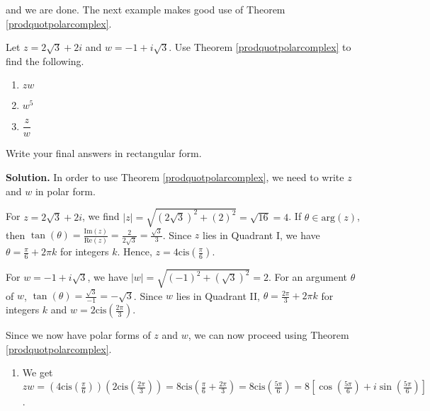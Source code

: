 \documentclass{ximera}
\begin{document}
and we are done.  The next example makes good use of Theorem \ref{prodquotpolarcomplex}.


\begin{ex}  \label{polararithmeticex} Let $z = 2\sqrt{3} + 2i$ and $w = -1 + i\sqrt{3}$.  Use Theorem \ref{prodquotpolarcomplex} to find the following.

\begin{multicols}{3}

\begin{enumerate}

\item $zw$

\item  $w^5$

\item $\dfrac{z}{w}$

\end{enumerate}

\end{multicols}

Write your final answers in rectangular form.

\medskip

{\bf Solution.}  In order to use Theorem \ref{prodquotpolarcomplex}, we need to write $z$ and $w$ in polar form.

\smallskip

  For $z=2\sqrt{3} + 2i$, we find $|z| = \sqrt{(2\sqrt{3})^2 + (2)^2} = \sqrt{16} = 4$.  If $\theta \in \text{arg}(z)$, then  $\tan(\theta) = \frac{\text{Im}(z)}{\text{Re}(z)} = \frac{2}{2\sqrt{3}} = \frac{\sqrt{3}}{3}$.  Since $z$ lies in Quadrant I, we have $\theta = \frac{\pi}{6} + 2\pi k$ for integers $k$.  Hence, $z = 4 \text{cis}\left(\frac{\pi}{6}\right)$. 
  
  \smallskip
  
  For $w = -1 + i\sqrt{3}$, we have $|w| = \sqrt{(-1)^2+(\sqrt{3})^2} = 2$.  For an argument $\theta$ of $w$,  $\tan(\theta) = \frac{\sqrt{3}}{-1} = -\sqrt{3}$.  Since $w$ lies in Quadrant II,  $\theta = \frac{2\pi}{3} + 2\pi k$ for integers $k$ and $w = 2\text{cis}\left(\frac{2\pi}{3}\right)$.  
  
  \smallskip
  
  Since we now have polar forms of $z$ and $w$, we can now proceed using Theorem \ref{prodquotpolarcomplex}.
  
  \begin{enumerate}

\item  We get $zw = \left(4 \text{cis}\left(\frac{\pi}{6}\right)\right) \left(2\text{cis}\left(\frac{2\pi}{3}\right)\right) = 8\text{cis}\left(\frac{\pi}{6} + \frac{2\pi}{3}\right) = 8\text{cis}\left(\frac{5\pi}{6}\right) = 8\left[ \cos\left(\frac{5\pi}{6}\right) + i\sin\left(\frac{5\pi}{6}\right) \right]$. 


\end{enumerate}
\end{ex}
\end{document}
